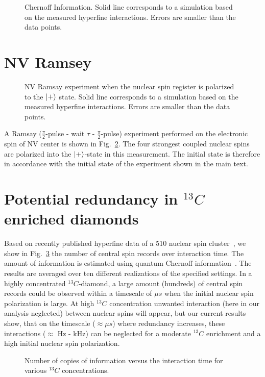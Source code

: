 \documentclass[aps,floatfix,footinbib,superscriptaddress]{revtex4-1}
\begin{document}
\begin{figure}[H]
\centerline{}
\caption{Chernoff Information. Solid line corresponds to a simulation based on the measured hyperfine interactions. Errors are smaller than the data points.}
\label{fig:S5}
\end{figure}

\section{NV Ramsey}

\begin{figure}[H]
\centerline{}
\caption{NV Ramsay experiment when the nuclear spin register is polarized to the $|+\rangle$ state. Solid line corresponds to a simulation based on the measured hyperfine interactions. Errors are smaller than the data points.}
\label{fig:S3}
\end{figure}

A Ramsay ($\frac{\pi}{2}$-pulse - wait $\tau$ - $\frac{\pi}{2}$-pulse) experiment performed on the electronic spin of NV center is shown in Fig.~\ref{fig:S3}. The four strongest coupled nuclear spins are polarized into the $|+\rangle$-state in this measurement. The initial state is therefore in accordance with the initial state of the experiment shown in the main text. 

\section{Potential redundancy in $^{13}C$ enriched diamonds}

Based on recently published hyperfine data of a 510 nuclear spin cluster~\cite{Nizovtsev18}, we show in Fig.~\ref{fig:S6} the number of central spin records over interaction time. The amount of information is estimated using quantum Chernoff information~\cite{Zwolak14,zwolak16}. The results are averaged over ten different realizations of the specified settings. In a highly concentrated $^{13}C$-diamond, a large amount (hundreds) of central spin records could be observed within a timescale of $\mu s$ when the initial nuclear spin polarization is large. At  high $^{13}C$ concentration unwanted  interaction (here in our analysis neglected) between nuclear spins will appear, but our current results show, that on the timescale ($\approx \mu s$) where redundancy increases, these interactions ($\approx$ Hz - kHz) can be neglected for a moderate $^{13}C$ enrichment and a high initial nuclear spin polarization.

\begin{figure}[H]
\centerline{}
\caption{Number of copies of information versus the interaction time for various $^{13}C$ concentrations.}
\label{fig:S6}
\end{figure}



\end{document}
